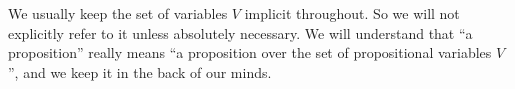 \begin{node}\label{prop-0003}%
We usually keep the set of variables $V$ implicit throughout. So we will
not explicitly refer to it unless absolutely necessary. We will
understand that ``a proposition'' really means ``a proposition over the
set of propositional variables $V$'', and we keep it in the back of our minds.
\end{node}
